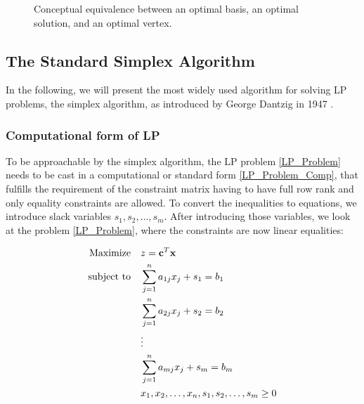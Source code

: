 \begin{figure}[!htb]
    \centering
    \caption{Conceptual equivalence between an optimal basis, an optimal solution, and an optimal vertex.}
    \label{equivalence_terms}
\end{figure}

\subsection{The Standard Simplex Algorithm}

In the following, we will present the most widely used algorithm for solving LP problems, the simplex algorithm, as introduced by George Dantzig in 1947 \parencite{dantzig1990origins}.

\subsubsection{Computational form of LP}

To be approachable by the simplex algorithm, the LP problem \ref{LP_Problem} needs to be cast in a computational or standard form \ref{LP_Problem_Comp}, that fulfills the requirement of the constraint matrix having to have full row rank and only equality constraints are allowed. To convert the inequalities to equations, we introduce slack variables \(s_1, s_2, \dots, s_m\). After introducing those variables, we look at the problem \ref{LP_Problem}, where the constraints are now linear equalities:

\begin{align}
    \text{Maximize} \quad   & z = \mathbf{c}^T \mathbf{x} \notag                            \\
    \text{subject to} \quad & \sum_{j=1}^{n} a_{1j} x_j + s_1 = b_1 \notag                  \\
                            & \sum_{j=1}^{n} a_{2j} x_j + s_2 = b_2 \notag                  \\
                            & \vdots \notag                                                 \\
                            & \sum_{j=1}^{n} a_{mj} x_j + s_m = b_m \label{LP_Problem_Comp} \\
                            & x_1, x_2, \dots, x_n, s_1, s_2, \dots, s_m \geq 0 \notag
\end{align}

